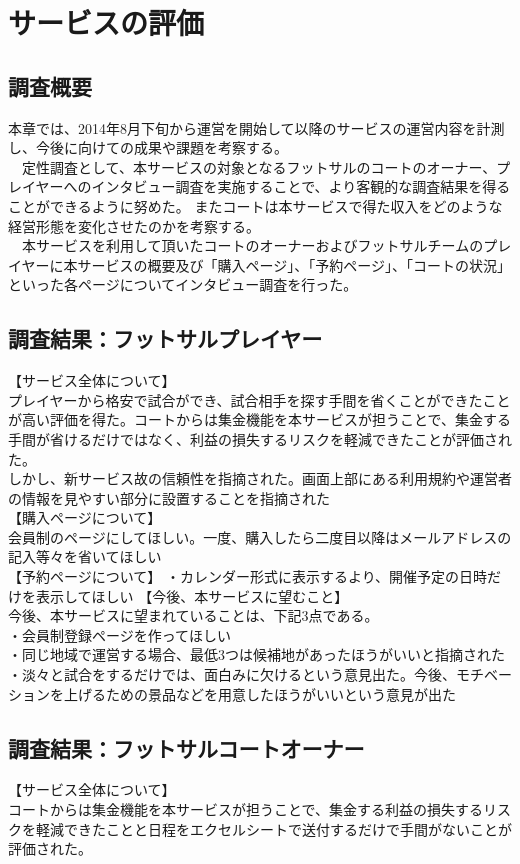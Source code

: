 \chapter{サービスの評価}
\section{調査概要}
本章では、2014年8月下旬から運営を開始して以降のサービスの運営内容を計測し、今後に向けての成果や課題を考察する。
\\　定性調査として、本サービスの対象となるフットサルのコートのオーナー、プレイヤーへのインタビュー調査を実施することで、より客観的な調査結果を得ることができるように努めた。
またコートは本サービスで得た収入をどのような経営形態を変化させたのかを考察する。
\\　本サービスを利用して頂いたコートのオーナーおよびフットサルチームのプレイヤーに本サービスの概要及び「購入ページ」、「予約ページ」、「コートの状況」といった各ページについてインタビュー調査を行った。
\section{調査結果：フットサルプレイヤー}
【サービス全体について】
\\プレイヤーから格安で試合ができ、試合相手を探す手間を省くことができたことが高い評価を得た。コートからは集金機能を本サービスが担うことで、集金する手間が省けるだけではなく、利益の損失するリスクを軽減できたことが評価された。
\\しかし、新サービス故の信頼性を指摘された。画面上部にある利用規約や運営者の情報を見やすい部分に設置することを指摘された
\\【購入ページについて】
\\会員制のページにしてほしい。一度、購入したら二度目以降はメールアドレスの記入等々を省いてほしい
\\【予約ページについて】
・カレンダー形式に表示するより、開催予定の日時だけを表示してほしい
【今後、本サービスに望むこと】
\\今後、本サービスに望まれていることは、下記3点である。
\\・会員制登録ページを作ってほしい
\\・同じ地域で運営する場合、最低3つは候補地があったほうがいいと指摘された
\\・淡々と試合をするだけでは、面白みに欠けるという意見出た。今後、モチベーションを上げるための景品などを用意したほうがいいという意見が出た




\section{調査結果：フットサルコートオーナー}
【サービス全体について】
\\コートからは集金機能を本サービスが担うことで、集金する利益の損失するリスクを軽減できたことと日程をエクセルシートで送付するだけで手間がないことが評価された。


